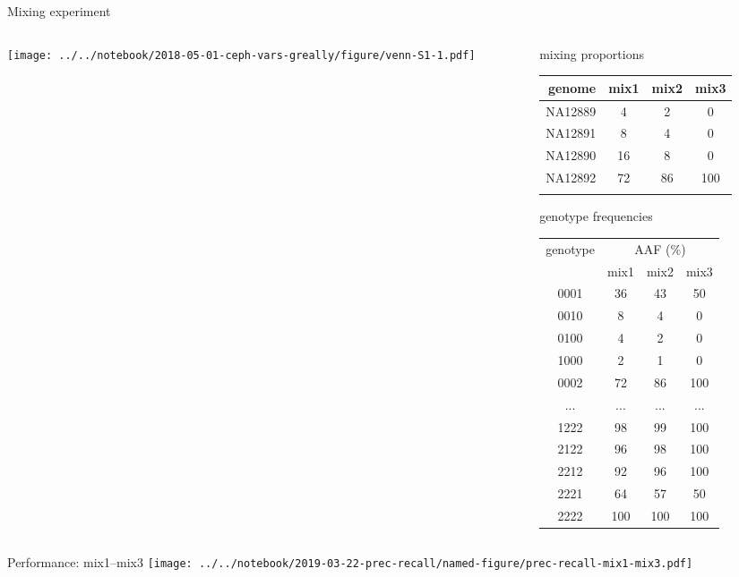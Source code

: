 \documentclass{beamer}
\begin{document}
\begin{frame}{Mixing experiment}
\begin{columns}[t]
\begin{column}{0.5\textwidth}

\texttt{[image: ../../notebook/2018-05-01-ceph-vars-greally/figure/venn-S1-1.pdf]}
\end{column}

\begin{column}{0.5\textwidth}

{\tiny
{\large mixing proportions}

\begin{tabular}{r|ccc}
genome & mix1 & mix2 & mix3 \\
\hline
NA12889 & 4 & 2 & 0 \\
NA12891 & 8 & 4 & 0 \\
NA12890 & 16 & 8 & 0 \\
NA12892 & 72 & 86 & 100 \\
& & & \\
\end{tabular}
\vfill
{\large genotype frequencies}

\begin{tabular}{c|ccc}
genotype & \multicolumn{3}{c}{AAF (\%)} \\
& mix1 &  mix2 & mix3 \\
\hline
0001 & 36 & 43 & 50\\
0010 & 8 & 4 & 0\\
0100 & 4 & 2 & 0\\
1000 & 2 & 1 & 0\\
0002 & 72 & 86 & 100\\
... & ... & ... & ...\\
1222 & 98 & 99 & 100\\
2122 & 96 & 98 & 100\\
2212 & 92 & 96 & 100\\
2221 & 64 & 57 & 50\\
2222 & 100 & 100 & 100\\
\end{tabular}
}
\end{column}
\end{columns}
\end{frame}

\begin{frame}{Performance: mix1--mix3}
\texttt{[image: ../../notebook/2019-03-22-prec-recall/named-figure/prec-recall-mix1-mix3.pdf]}
\end{frame}
\end{document}
